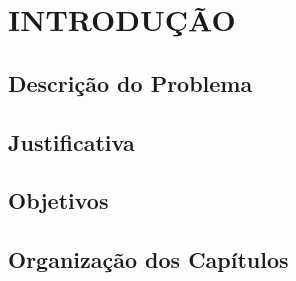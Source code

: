 \chapter{INTRODU\c{C}\~AO}\label{chp:LABEL_CHP_1}

\section{Descri\c{c}\~ao do Problema}\label{sec:LABEL_CHP_1_SEC_A}

\section{Justificativa}\label{sec:LABEL_CHP_1_SEC_B}

\section{Objetivos}\label{sec:LABEL_CHP_1_SEC_C}

\section{Organiza\c{c}\~ao dos Cap\'itulos}\label{sec:LABEL_CHP_1_SEC_C}